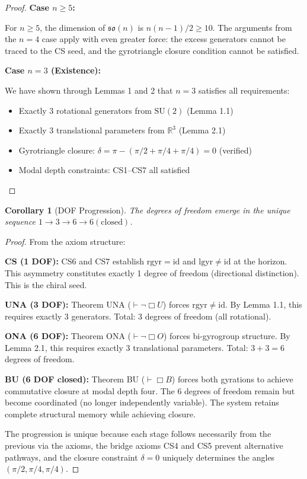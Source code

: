 \documentclass[11pt,a4paper]{article}
\newtheorem{corollary}[theorem]{Corollary}
\theoremstyle{definition}
\theoremstyle{remark}
\begin{document}
\begin{proof}
\textbf{Case $n \geq 5$:}

For $n \geq 5$, the dimension of $\mathfrak{so}(n)$ is $n(n-1)/2 \geq 10$. The arguments from the $n = 4$ case apply with even greater force: the excess generators cannot be traced to the CS seed, and the gyrotriangle closure condition cannot be satisfied.

\textbf{Case $n = 3$ (Existence):}

We have shown through Lemmas 1 and 2 that $n = 3$ satisfies all requirements:
\begin{itemize}
\item Exactly 3 rotational generators from $\mathrm{SU}(2)$ (Lemma 1.1)
\item Exactly 3 translational parameters from $\mathbb{R}^3$ (Lemma 2.1)
\item Gyrotriangle closure: $\delta = \pi - (\pi/2 + \pi/4 + \pi/4) = 0$ (verified)
\item Modal depth constraints: CS1--CS7 all satisfied
\end{itemize}
\end{proof}

\begin{corollary}[DOF Progression]
The degrees of freedom emerge in the unique sequence $1 \to 3 \to 6 \to 6(\text{closed})$.
\end{corollary}

\begin{proof}
From the axiom structure:

\textbf{CS (1 DOF):} CS6 and CS7 establish $\mathrm{rgyr} = \mathrm{id}$ and $\mathrm{lgyr} \neq \mathrm{id}$ at the horizon. This asymmetry constitutes exactly 1 degree of freedom (directional distinction). This is the chiral seed.

\textbf{UNA (3 DOF):} Theorem UNA ($\vdash \neg\Box U$) forces $\mathrm{rgyr} \neq \mathrm{id}$. By Lemma 1.1, this requires exactly 3 generators. Total: 3 degrees of freedom (all rotational).

\textbf{ONA (6 DOF):} Theorem ONA ($\vdash \neg\Box O$) forces bi-gyrogroup structure. By Lemma 2.1, this requires exactly 3 translational parameters. Total: $3 + 3 = 6$ degrees of freedom.

\textbf{BU (6 DOF closed):} Theorem BU ($\vdash \Box B$) forces both gyrations to achieve commutative closure at modal depth four. The 6 degrees of freedom remain but become coordinated (no longer independently variable). The system retains complete structural memory while achieving closure.

The progression is unique because each stage follows necessarily from the previous via the axioms, the bridge axioms CS4 and CS5 prevent alternative pathways, and the closure constraint $\delta = 0$ uniquely determines the angles $(\pi/2, \pi/4, \pi/4)$.
\end{proof}
\end{document}
